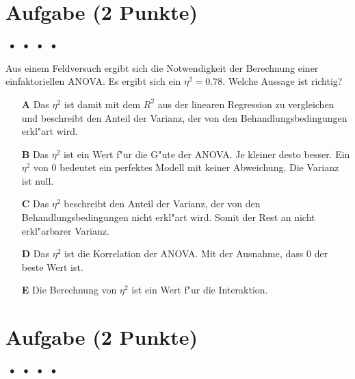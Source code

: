 \documentclass[a4paper, 9pt]{scrartcl}\usepackage[]{graphicx}\usepackage[]{xcolor}
\begin{document}
\section{Aufgabe \hfill (2 Punkte)}

\ifcollection
\begin{flushright}
\tiny\vspace{-2Ex}
\textbf{\examinhaltstart}
\exammodulemathstat $\;\bullet$
\exammodulestat $\;\bullet$
\exammodulestatbbv $\;\bullet$
\exammodulestatversuch $\;\bullet$
\exammodulebiostat
\vspace{-1Ex}
\end{flushright}
\fi






Aus einem Feldversuch ergibt sich die Notwendigkeit der Berechnung einer einfaktoriellen ANOVA. Es ergibt sich ein $\eta^2 = 0.78$. Welche Aussage ist richtig?



\begin{enumerate}
\item [\textbf{A} \msquare] Das $\eta^2$ ist damit mit dem $R^2$ aus der linearen Regression zu vergleichen und beschreibt den Anteil der Varianz, der von den Behandlungsbedingungen erkl{"a}rt wird.
\item [\textbf{B} \msquare] Das $\eta^2$ ist ein Wert f{"u}r die G{"u}te der ANOVA. Je kleiner desto besser. Ein $\eta^2$ von 0 bedeutet ein perfektes Modell mit keiner Abweichung. Die Varianz ist null.
\item [\textbf{C} \msquare] Das $\eta^2$ beschreibt den Anteil der Varianz, der von den Behandlungsbedingungen nicht erkl{"a}rt wird. Somit der Rest an nicht erkl{"a}rbarer Varianz.
\item [\textbf{D} \msquare] Das $\eta^2$ ist die Korrelation der ANOVA. Mit der Ausnahme, dass 0 der beste Wert ist.
\item [\textbf{E} \msquare] Die Berechnung von $\eta^2$ ist ein Wert f{"u}r die Interaktion.
\end{enumerate}

\section{Aufgabe \hfill (2 Punkte)}

\ifcollection
\begin{flushright}
\tiny\vspace{-2Ex}
\textbf{\examinhaltstart}
\exammodulemathstat $\;\bullet$
\exammodulestat $\;\bullet$
\exammodulestatbbv $\;\bullet$
\exammodulestatversuch $\;\bullet$
\exammodulebiostat
\vspace{-1Ex}
\end{flushright}
\fi
\end{document}
